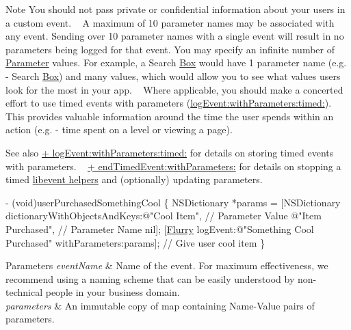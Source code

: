 \begin{DoxyNote}{Note}
You should not pass private or confidential information about your users in a custom event. ~\newline
 A maximum of 10 parameter names may be associated with any event. Sending over 10 parameter names with a single event will result in no parameters being logged for that event. You may specify an infinite number of \hyperlink{structParameter}{Parameter} values. For example, a Search \hyperlink{classBox}{Box} would have 1 parameter name (e.\+g. -\/ Search \hyperlink{classBox}{Box}) and many values, which would allow you to see what values users look for the most in your app. ~\newline
 Where applicable, you should make a concerted effort to use timed events with parameters (\hyperlink{interfaceFlurry_a66eeaeb9725692dc354fdd350c691cfc}{log\+Event\+:with\+Parameters\+:timed\+:}). This provides valuable information around the time the user spends within an action (e.\+g. -\/ time spent on a level or viewing a page).
\end{DoxyNote}
\begin{DoxySeeAlso}{See also}
\hyperlink{interfaceFlurry_a66eeaeb9725692dc354fdd350c691cfc}{+ log\+Event\+:with\+Parameters\+:timed\+:} for details on storing timed events with parameters. ~\newline
 \hyperlink{interfaceFlurry_a9540add7440d1b716bfb8fb8efa85801}{+ end\+Timed\+Event\+:with\+Parameters\+:} for details on stopping a timed \hyperlink{group__event}{libevent helpers} and (optionally) updating parameters.
\end{DoxySeeAlso}

\begin{DoxyCode}
   - (void)userPurchasedSomethingCool 
\{
NSDictionary *params =
[NSDictionary dictionaryWithObjectsAndKeys:\textcolor{stringliteral}{@"Cool Item"}, \textcolor{comment}{// Parameter Value}
\textcolor{stringliteral}{@"Item Purchased"}, \textcolor{comment}{// Parameter Name}
nil];
[\hyperlink{interfaceFlurry}{Flurry} logEvent:\textcolor{stringliteral}{@"Something Cool Purchased"} withParameters:params];
\textcolor{comment}{// Give user cool item}
\}
\end{DoxyCode}



\begin{DoxyParams}{Parameters}
{\em event\+Name} & Name of the event. For maximum effectiveness, we recommend using a naming scheme that can be easily understood by non-\/technical people in your business domain. \\
\hline
{\em parameters} & An immutable copy of map containing Name-\/\+Value pairs of parameters. \\
\hline
\end{DoxyParams}
\mbox{\label{interfaceFlurry_a66eeaeb9725692dc354fdd350c691cfc}} 
